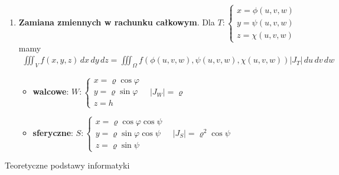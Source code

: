 \documentclass[12pt]{article}
\begin{document}
\begin{enumerate}
        \item \textbf{Zamiana zmiennych w rachunku całkowym}.
        Dla  $ T: \begin{cases}
                      x = \phi(u,v,w) \\
                      y = \psi(u,v,w) \\
                      z = \chi(u,v,w)
        \end{cases}$ mamy
        \begin{align*}
            \iiint_V f(x,y,z)\,dx\,dy\,dz = \iiint_{\Omega} f(\phi(u,v,w), \psi(u,v,w), \chi(u,v,w))
            |J_T| \,du\,dv\,dw
        \end{align*}
        \begin{itemize}[noitemsep]
            \item \textbf{walcowe}:  $W: \begin{cases}
                                             x = \varrho \cos \varphi \\
                                             y = \varrho \sin \varphi \\
                                             z = h
            \end{cases} ~~~~
            |J_W| = \varrho$

            \item \textbf{sferyczne}: $S: \begin{cases}
                                              x = \varrho \cos \varphi \cos \psi \\
                                              y = \varrho \sin \varphi \cos \psi \\
                                              z = \varrho \sin \psi
            \end{cases} ~~~~
            |J_S| = \varrho^2 \cos \psi$
        \end{itemize}
    \end{enumerate}

    \newpage

    \begin{center} {\LARGE Teoretyczne podstawy informatyki} \end{center}
\end{document}
